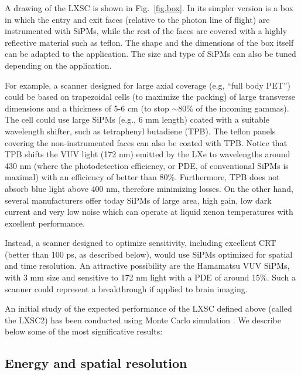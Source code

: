 \documentclass[review]{elsarticle}
\begin{document}
A drawing of the LXSC is shown in Fig.~\ref{fig.box}. In its simpler version is a box in which 
the entry and exit faces (relative to the photon line of flight) are instrumented with SiPMs, while the rest of the faces are covered with a highly reflective material such as teflon. The shape and the dimensions of the box itself can be adapted to the application. The size and type of SiPMs can also be tuned depending on the application.

For example, a scanner designed for large axial coverage (e.g, ``full body PET'') could be based on trapezoidal cells (to maximize the packing) of large transverse dimensions and a thickness of 5-6 cm (to stop $\sim$80\% of the incoming gammas). The cell could use large
SiPMs (e.g., 6 mm length) coated with a suitable wavelength shifter, such as tetraphenyl butadiene (TPB). The teflon panels covering the non-instrumented faces can also be coated with TPB. Notice that TPB shifts the VUV light (172 nm) emitted by the LXe  to wavelengths around 430 nm (where the photodetection efficiency, or PDE,  of conventional SiPMs is maximal) with an efficiency of better than 80\%. Furthermore, TPB does not absorb blue light above 400 nm, therefore minimizing losses. On the other hand, several manufacturers offer today SiPMs of large area, high gain, low dark current and very low noise which can operate at liquid xenon temperatures with excellent performance.

Instead, a scanner designed to optimize sensitivity, including excellent CRT (better than 100 ps, as described below), would use SiPMs optimized for spatial and time resolution. An attractive possibility are the Hamamatsu VUV SiPMs, with 3 mm size and sensitive to 172 nm light with a PDE of around 15\%. Such a scanner could represent a breakthrough if applied to brain imaging.  

An initial study of the expected performance of the LXSC defined above (called the LXSC2) has been conducted using Monte Carlo simulation \cite{tfm}. We describe below some of the most significative results:

\subsection{Energy and spatial resolution}
\end{document}
